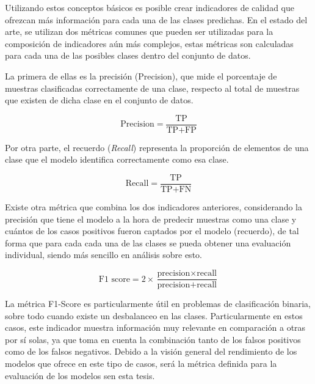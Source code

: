 \documentclass{uathesis-es}
\begin{document}
	Utilizando estos conceptos básicos es posible crear indicadores de calidad que ofrezcan más información para cada una de las clases predichas. En el estado del arte, se utilizan dos métricas comunes que pueden ser utilizadas para la composición de indicadores aún más complejos, estas métricas son calculadas para cada una de las posibles clases dentro del conjunto de datos.
	
	La primera de ellas es la precisión (Precision), que mide el porcentaje de muestras clasificadas correctamente de una clase, respecto al total de muestras que existen de dicha clase en el conjunto de datos.
	
	$$\text{Precision} = \frac{{\text{TP}}}{{\text{TP} + \text{FP}}}$$
	
	Por otra parte, el recuerdo (\textit{Recall}) representa la proporción de elementos de una clase que el modelo identifica correctamente como esa clase.
	
	$$\text{Recall} = \frac{{\text{TP}}}{{\text{TP} + \text{FN}}}$$
	
	Existe otra métrica que combina los dos indicadores anteriores, considerando la precisión que tiene el modelo a la hora de predecir muestras como una clase y cuántos de los casos positivos fueron captados por el modelo (recuerdo), de tal forma que para cada cada una de las clases se pueda obtener una evaluación individual, siendo más sencillo en análisis sobre esto. 
	
	$$\text{F1 score} = 2 \times \frac{{\text{precision} \times \text{recall}}}{{\text{precision} + \text{recall}}}$$
	
	
	
	
	La métrica F1-Score es particularmente útil en problemas de clasificación binaria, sobre todo cuando existe un desbalanceo en las clases. Particularmente en estos casos, este indicador muestra información muy relevante en comparación a otras por sí solas, ya que toma en cuenta la combinación tanto de los falsos positivos como de los falsos negativos. Debido a la visión general del rendimiento de los modelos que ofrece en este tipo de casos, será la métrica definida para la evaluación de los modelos sen esta tesis.
	
	
	
\end{document}
